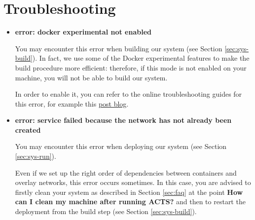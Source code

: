 \section{Troubleshooting}

\begin{itemize}

\item \textbf{error: docker experimental not enabled}

You may encounter this error when building our system (see Section
\ref{sec:sys-build}).
In fact, we use some of the Docker experimental features to make the build
procedure more efficient: therefore, if this mode is not enabled on your
machine, you will not be able to build our system.

In order to enable it, you can refer to the online troubleshooting guides for
this error, for example this
\href{https://sreeninet.wordpress.com/2017/01/27/docker-1-13-experimental-features/}{post blog}.

\item \textbf{error: service failed because the network has not already been
  created}

You may encounter this error when deploying our system (see Section
\ref{sec:sys-run}).

Even if we set up the right order of dependencies between containers and
overlay networks, this error occurs sometimes.
In this case, you are advised to firstly clean your system as described in
Section \ref{sec:faq} at the point \textbf{How can I clean my machine after
running ACTS?} and then to restart the deployment from the build step (see
Section \ref{sec:sys-build}).


\end{itemize}
